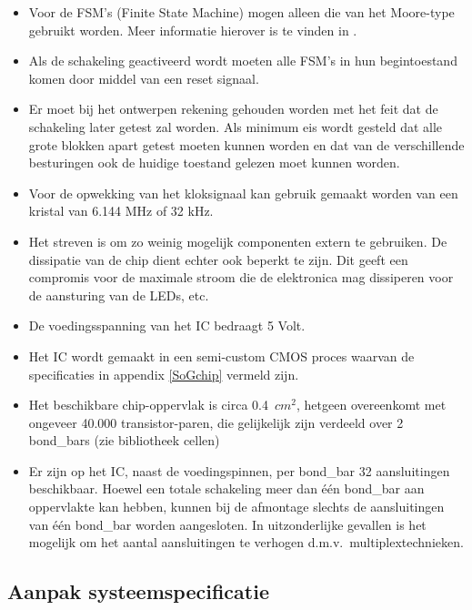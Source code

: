 \begin{itemize}
\item
Voor de FSM's (Finite State Machine) mogen alleen die van het
Moore-type gebruikt worden. Meer informatie hierover is te vinden in
\cite{DT}.
\item
Als de schakeling geactiveerd wordt moeten alle FSM's in hun
begintoestand komen door middel van een reset signaal.
\item
Er moet bij het ontwerpen rekening gehouden worden met het feit dat de
schakeling later getest zal worden. Als minimum eis wordt gesteld dat
alle grote blokken apart getest moeten kunnen worden en dat van de
verschillende besturingen ook de huidige toestand gelezen moet kunnen
worden.
\item
Voor de opwekking van het kloksignaal kan gebruik gemaakt worden van
een kristal van 6.144 MHz of 32 kHz.
\item
Het streven is om zo weinig mogelijk componenten extern
te gebruiken. De dissipatie van de chip dient echter ook beperkt
te zijn. Dit geeft een compromis voor de maximale stroom die de elektronica
mag dissiperen voor de aansturing van de LEDs, etc.
\item
De voedingsspanning van het IC bedraagt 5 Volt.
\item
Het IC wordt gemaakt in een semi-custom CMOS proces waarvan de
specificaties in appendix \ref{SoGchip} vermeld zijn.
\item
Het beschikbare chip-oppervlak is circa 0.4 $\,cm^2$,
hetgeen overeenkomt met ongeveer 40.000 transistor-paren,
die gelijkelijk zijn verdeeld over 2 bond\_bars (zie bibliotheek cellen)
\item
Er zijn op het IC, naast de voedingspinnen, per bond\_bar 32 aansluitingen
beschikbaar.
Hoewel een totale schakeling meer dan \'e\'en bond\_bar aan oppervlakte
kan hebben, kunnen bij de afmontage slechts de aansluitingen
van \'e\'en bond\_bar worden aangesloten.
In uitzonderlijke gevallen is het mogelijk om het
aantal aansluitingen te verhogen d.m.v.\ multiplextechnieken.
\end{itemize}

\subsection{Aanpak systeemspecificatie}

